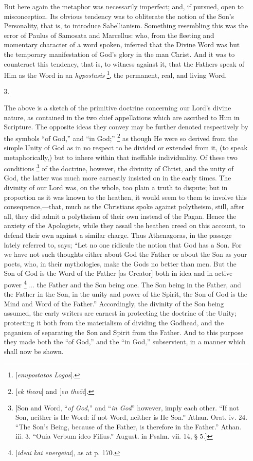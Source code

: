 But here again the metaphor was necessarily imperfect; and,
if pursued, open to misconception. Its obvious tendency was to
obliterate the notion of the Son's Personality, that is, to introduce
Sabellianism. Something resembling this was the error of Paulus of
Samosata and Marcellus: who, from the fleeting and momentary character
of a word spoken, inferred that the Divine Word was but the temporary
manifestation of God's glory in the man Christ. And it was to
counteract this tendency, that is, to witness against it, that the
Fathers speak of Him as the Word in an \emph{hypostasis} \footnote{[\emph{enupostatos Logos}].}, the permanent, real, and living Word.

3.

The above is a sketch of the primitive doctrine concerning our Lord's
divine nature, as contained in the two chief appellations which are
ascribed to Him in Scripture. The opposite ideas they convey may be
further denoted respectively by the symbols ``of God,'' and
``in God;'' \footnote{[\emph{ek theou}] and [\emph{en the\={o}i}].} as
though He were so derived from the simple Unity of God as in no
respect to be divided or extended from it, (to speak metaphorically,)
but to inhere within that ineffable individuality. Of these two
conditions \footnote{[Son and Word, ``\emph{of God},''
and ``\emph{in God}'' however, imply each other. ``If not
Son, neither is He Word: if not Word, neither is He Son.'' Athan.
Orat. iv. 24. ``The Son's Being, because of the Father, is
therefore in the Father.'' Athan. iii. 3. ``Ouia Verbum ideo
Filius.'' August. in Psalm. vii. 14, § 5.]} of the
doctrine, however, the divinity of Christ, and the unity of God, the
latter was much more earnestly insisted on in the early times. The
divinity of our Lord was, on the whole, too plain a truth to
dispute; but in proportion as it was known to the heathen, it would
seem to them to involve this consequence,—that, much as the
Christians spoke against polytheism, still, after all, they did admit
a polytheism of their own instead of the Pagan. Hence the anxiety of
the Apologists, while they assail the heathen creed on this account,
to defend their own against a similar charge. Thus Athenagoras, in the
passage lately referred to, says; ``Let no one ridicule the notion
that God has a Son. For we have not such thoughts either about God the
Father or about the Son as your poets, who, in their mythologies, make
the Gods no better than men. But the Son of God is the Word of the
Father [as Creator] both in idea and in active power \footnote{[\emph{ideai kai energeiai}], as at p.
170.} ... the Father and the Son being one. The Son being in the
Father, and the Father in the Son, in the unity and power of the
Spirit, the Son of God is the Mind and Word of the Father.''
Accordingly, the divinity of the Son being assumed, the early writers
are earnest in protecting the doctrine of the Unity; protecting it
both from the materialism of dividing the Godhead, and the paganism of
separating the Son and Spirit from the Father. And to this purpose
they made both the ``of God,'' and the ``in God,''
subservient, in a manner which shall now be shown.

